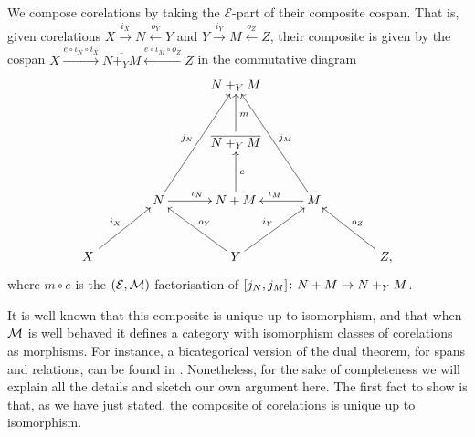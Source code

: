 We compose corelations by taking the $\mathcal E$-part of their composite
cospan. That is, given corelations $X \stackrel{i_X}{\longrightarrow} N
\stackrel{o_Y}{\longleftarrow} Y$ and $Y \stackrel{i_Y}{\longrightarrow} M
\stackrel{o_Z}{\longleftarrow} Z$, their composite is given by the cospan $X
\xrightarrow{e\circ\iota_N\circ i_X} \overline{N+_YM} \xleftarrow{e \circ
\iota_M \circ o_Z} Z$ in the commutative diagram
\[
  \xymatrixrowsep{7ex}
  \xymatrixcolsep{7ex}
  \xymatrix{
    && N+_YM \\
    && \overline{N+_YM} \ar[u]_{m} \\
    & N \ar[uur]^{j_N} \ar[r]^{\iota_N}& N+M
    \ar[u]_{e}& 
    M \ar[uul]_{j_M}  \ar[l]_{\iota_M} \\
    \quad X \quad \ar[ur]^{i_X} && Y \ar[ul]_{o_Y} \ar[ur]^{i_Y} && \quad Z, \quad \ar[ul]_{o_Z}
  }
\]
where $m \circ e$ is the $(\mathcal E,\mathcal M)$-factorisation of $[j_N,j_M]{\colon} N+M
\to N+_YM$. 

It is well known that this composite is unique up to isomorphism, and that when
$\mathcal M$ is well behaved it defines a category with isomorphism classes of
corelations as morphisms. For instance, a bicategorical version of the dual
theorem, for spans and relations, can be found in \cite{JW00}. Nonetheless, for
the sake of completeness we will explain all the details and sketch our own
argument here. The first fact to show is that, as we have just stated, the
composite of corelations is unique up to isomorphism.

